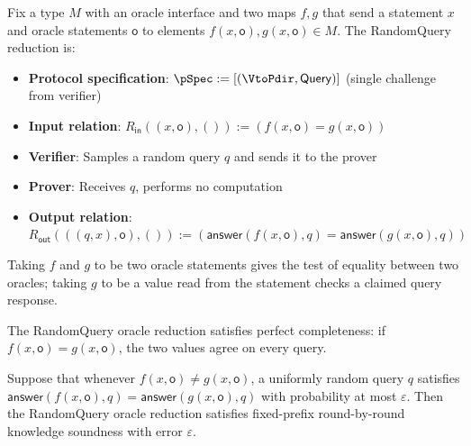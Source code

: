 \begin{definition}
    \label{def:randomquery_oracle_reduction}
    Fix a type $M$ with an oracle interface and two maps $f, g$ that send a statement $x$ and oracle statements $\mathsf{o}$ to elements $f(x, \mathsf{o}), g(x, \mathsf{o}) \in M$. The RandomQuery reduction is:
    \begin{itemize}
        \item \textbf{Protocol specification}: $\pSpec := [(\VtoPdir, \mathsf{Query})]$ (single challenge from verifier)
        \item \textbf{Input relation}: $R_{\mathsf{in}}((x, \mathsf{o}), ()) := (f(x, \mathsf{o}) = g(x, \mathsf{o}))$
        \item \textbf{Verifier}: Samples a random query $q$ and sends it to the prover
        \item \textbf{Prover}: Receives $q$, performs no computation
        \item \textbf{Output relation}: $R_{\mathsf{out}}(((q, x), \mathsf{o}), ()) := (\mathsf{answer}(f(x, \mathsf{o}), q) = \mathsf{answer}(g(x, \mathsf{o}), q))$
    \end{itemize}
    Taking $f$ and $g$ to be two oracle statements gives the test of equality between two oracles; taking $g$ to be a value read from the statement checks a claimed query response.
    \leanok
\end{definition}

\begin{theorem}
    The RandomQuery oracle reduction satisfies perfect completeness: if $f(x, \mathsf{o}) = g(x, \mathsf{o})$, the two values agree on every query.
    \leanok
\end{theorem}

\begin{theorem}
    Suppose that whenever $f(x, \mathsf{o}) \neq g(x, \mathsf{o})$, a uniformly random query $q$ satisfies $\mathsf{answer}(f(x, \mathsf{o}), q) = \mathsf{answer}(g(x, \mathsf{o}), q)$ with probability at most $\varepsilon$. Then the RandomQuery oracle reduction satisfies fixed-prefix round-by-round knowledge soundness with error $\varepsilon$.
    \leanok
\end{theorem}

